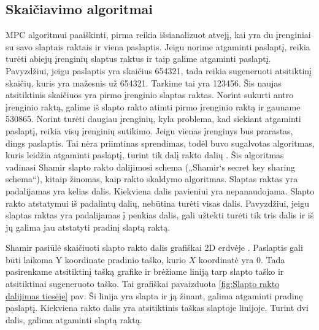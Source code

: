 \documentclass{VUMIFInfBakalaurinis}
\begin{document}
\subsection{Skaičiavimo algoritmai}
\par MPC algoritmui paaiškinti, pirma reikia išsianalizuot atvejį, kai yra du įrenginiai su savo slaptais raktais ir viena paslaptis. Jeigu norime atgaminti paslaptį, reikia turėti abiejų įrenginių slaptus raktus ir taip galime atgaminti paslaptį. Pavyzdžiui, jeigu paslaptis yra skaičius 654321, tada reikia sugeneruoti atsitiktinį skaičių, kuris yra mažesnis už 654321. Tarkime tai yra 123456. Šis naujas atsitiktinis skaičiuos yra pirmo įrenginio slaptas raktas. Norint sukurti antro įrenginio raktą, galime iš slapto rakto atimti pirmo įrenginio raktą ir gauname 530865. Norint turėti daugiau įrenginių, kyla problema, kad siekiant atgaminti paslaptį, reikia visų įrenginių sutikimo. Jeigu vienas įrenginys bus prarastas, dings paslaptis. Tai nėra priimtinas sprendimas, todėl buvo sugalvotas algoritmas, kuris leidžia atgaminti paslaptį, turint tik dalį rakto dalių \cite{23}. Šis algoritmas vadinasi Shamir slapto rakto dalijimosi schema („Shamir‘s secret key sharing schema“), kitaip žinomas, kaip rakto skaldymo algoritmas. Slaptas raktas yra padalijamas yra kelias dalis. Kiekviena dalis pavieniui yra nepanaudojama. Slapto rakto atstatymui iš padalintų dalių, nebūtina turėti visas dalis. Pavyzdžiui, jeigu slaptas raktas yra padalijamas į penkias dalis, gali užtekti turėti tik tris dalis ir iš jų galima jau atstatyti pradinį slaptą raktą.
\par Shamir pasiūlė skaičiuoti slapto rakto dalis grafiškai 2D erdvėje \cite{23}. Paslaptis gali būti laikoma Y koordinate pradinio taško, kurio $X$ koordinatė yra 0. Tada pasirenkame atsitiktinį tašką grafike ir brėžiame liniją tarp slapto taško ir atsitiktinai sugeneruoto taško. Tai grafiškai pavaizduota \ref{fig:Slapto rakto dalijimas tiesėje} pav. Ši linija yra slapta ir ją žinant, galima atgaminti pradinę paslaptį. Kiekviena rakto dalis yra atsitiktinis taškas slaptoje linijoje. Turint dvi dalis, galima atgaminti slaptą raktą.  
\end{document}

